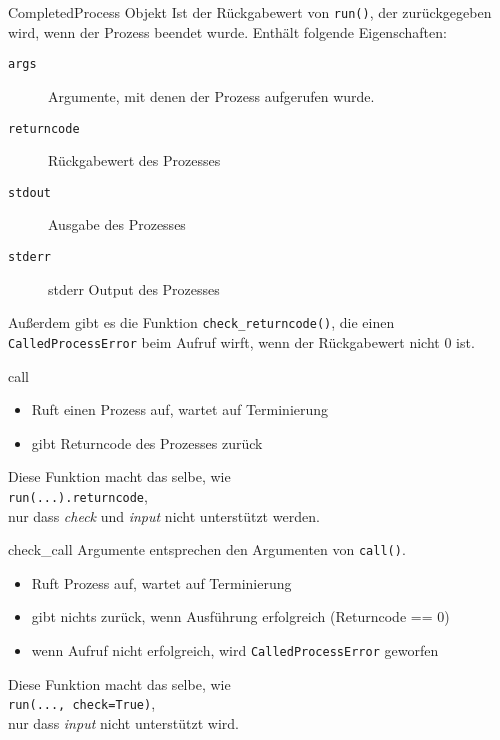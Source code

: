 \begin{frame}[fragile]{CompletedProcess Objekt}
	Ist der Rückgabewert von \texttt{run()}, der zur\"uckgegeben wird, wenn der Prozess beendet wurde.
	Enth\"alt folgende Eigenschaften: \\[.25cm]
	\begin{description}
		\item[\texttt{args}] Argumente, mit denen der Prozess aufgerufen wurde.
		\item[\texttt{returncode}] R\"uckgabewert des Prozesses
		\item[\texttt{stdout}] Ausgabe des Prozesses
		\item[\texttt{stderr}] stderr Output des Prozesses \\[.5cm]
	\end{description}
	Au{\ss}erdem gibt es die Funktion \texttt{check\_returncode()}, die einen \texttt{CalledProcessError}
	beim Aufruf wirft, wenn der R\"uckgabewert nicht 0 ist.
\end{frame}

\begin{frame}[fragile]{call}
	
	\begin{itemize}
		\item Ruft einen Prozess auf, wartet auf Terminierung
		\item gibt Returncode des Prozesses zur\"uck \\[.5cm]
	\end{itemize}
	Diese Funktion macht das selbe, wie \\
	\hspace*{1.5cm}\texttt{run(...).returncode}, \\
	nur dass \textit{check} und \textit{input} nicht unterst\"utzt werden.
\end{frame}

\begin{frame}[fragile]{check\_call}
	Argumente entsprechen den Argumenten von \texttt{call()}.
	\begin{itemize}
		\item Ruft Prozess auf, wartet auf Terminierung
		\item gibt nichts zur\"uck, wenn Ausf\"uhrung erfolgreich (Returncode == 0)
		\item wenn Aufruf nicht erfolgreich, wird \texttt{CalledProcessError} geworfen \\[.5cm]
	\end{itemize}
	Diese Funktion macht das selbe, wie \\
	\hspace*{1.5cm}\texttt{run(..., check=True)}, \\
	nur dass \textit{input} nicht unterst\"utzt wird.
\end{frame}

